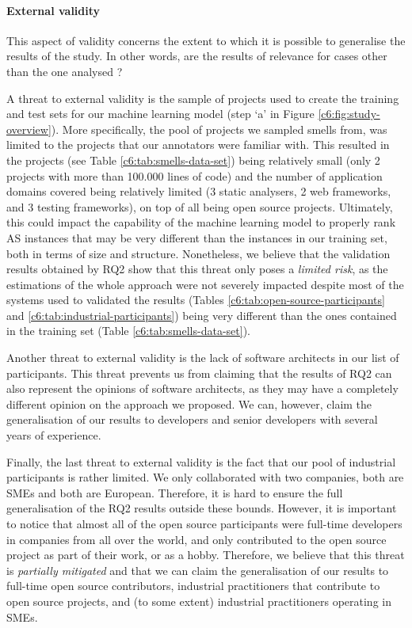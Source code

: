 \paragraph*{External validity}
This aspect of validity concerns the extent to which it is possible to generalise the results of the study. In other words, are the results of relevance for cases other than the one analysed \cite{Runeson2012}?

A threat to external validity is the sample of projects used to create the training and test sets for our machine learning model (step `a' in Figure \ref{c6:fig:study-overview}).
More specifically, the pool of projects we sampled smells from, was limited to the projects that our annotators were familiar with. This resulted in the projects (see Table \ref{c6:tab:smells-data-set}) being relatively small (only 2 projects with more than 100.000 lines of code) and the number of application domains covered being relatively limited (3 static analysers, 2 web frameworks, and 3 testing frameworks), on top of all being open source projects.
Ultimately, this could impact the capability of the machine learning model to properly rank AS instances that may be very different than the instances in our training set, both in terms of size and structure.
Nonetheless, we believe that the validation results obtained by RQ2 show that this threat only poses a \emph{limited risk}, as the estimations of the whole approach were not severely impacted despite most of the systems used to validated the results (Tables \ref{c6:tab:open-source-participants} and \ref{c6:tab:industrial-participants}) being very different than the ones contained in the training set (Table \ref{c6:tab:smells-data-set}).

Another threat to external validity is the lack of software architects in our list of participants.
This threat prevents us from claiming that the results of RQ2 can also represent the opinions of software architects, as they may have a completely different opinion on the approach we proposed.
We can, however, claim the generalisation of our results to developers and senior developers with several years of experience.

Finally, the last threat to external validity is the fact that our pool of industrial participants is rather limited. 
We only collaborated with two companies, both are SMEs and both are European.
Therefore, it is hard to ensure the full generalisation of the RQ2 results outside these bounds.
However, it is important to notice that almost all of the open source participants were full-time developers in companies from all over the world, and only contributed to the open source project as part of their work, or as a hobby.
Therefore, we believe that this threat is \emph{partially mitigated} and that we can claim the generalisation of our results to full-time open source contributors, industrial practitioners that contribute to open source projects, and (to some extent) industrial practitioners operating in SMEs.


